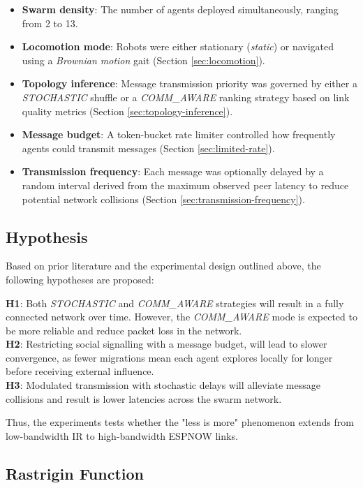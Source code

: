 \documentclass[conference]{IEEEtran}
\begin{document}
\begin{itemize}
  \item \textbf{Swarm density}: The number of agents deployed simultaneously, ranging from 2 to 13.
  \item \textbf{Locomotion mode}: Robots were either stationary (\emph{static}) or navigated using a \emph{Brownian motion} gait (Section \ref{sec:locomotion}).
  \item \textbf{Topology inference}: Message transmission priority was governed by either a \emph{STOCHASTIC} shuffle or a \emph{COMM\_AWARE} ranking strategy based on link quality metrics (Section \ref{sec:topology-inference}).
  \item \textbf{Message budget}: A token-bucket rate limiter controlled how frequently agents could transmit messages (Section \ref{sec:limited-rate}).
  \item \textbf{Transmission frequency}: Each message was optionally delayed by a random interval derived from the maximum observed peer latency to reduce potential network collisions (Section \ref{sec:transmission-frequency}).
\end{itemize}

\subsection{Hypothesis}

Based on prior literature and the experimental design outlined above, the following hypotheses are proposed:

\textbf{H1}: Both \emph{STOCHASTIC} and \emph{COMM\_AWARE} strategies will result in a fully connected network over time. However, the \emph{COMM\_AWARE} mode is expected to be more reliable and reduce packet loss in the network.\\

\textbf{H2}: Restricting social signalling with a message budget, will lead to slower convergence, as fewer migrations mean each agent explores locally for longer before receiving external influence.\\

\textbf{H3}: Modulated transmission with stochastic delays will alleviate message collisions and result is lower latencies across the swarm network.

Thus, the experiments tests whether the "less is more" phenomenon extends from low-bandwidth IR to high-bandwidth ESPNOW links.


\subsection{Rastrigin Function}
\end{document}
